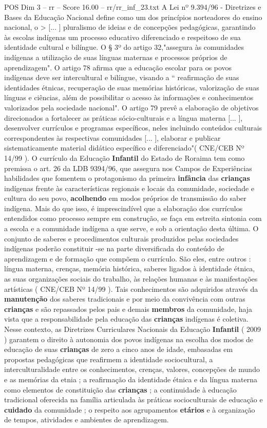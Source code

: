 \begin{textsample}{POS Dim 3 – rr – Score 16.00 – rr/rr\_inf\_23.txt}
A Lei nº 9.394/96 - Diretrizes e Bases da Educação Nacional define como um dos princípios norteadores do ensino nacional, o > [... ] pluralismo de ideias e de concepções pedagógicas, garantindo às escolas indígenas um processo educativo diferenciado e respeitoso de sua identidade cultural e bilíngue.
O § 3º do artigo 32,"assegura às comunidades indígenas a utilização de suas línguas maternas e processos próprios de aprendizagem".
O artigo 78 afirma que a educação escolar para os povos indígenas deve ser intercultural e bilíngue, visando a “ reafirmação de suas identidades étnicas, recuperação de suas memórias históricas, valorização de suas línguas e ciências, além de possibilitar o acesso às informações e conhecimentos valorizados pela sociedade nacional".
O artigo 79 prevê a elaboração de objetivos direcionados a fortalecer as práticas sócio-culturais e a língua materna [... ], desenvolver currículos e programas específicos, neles incluindo conteúdos culturais correspondentes às respectivas comunidades [... ], elaborar e publicar sistematicamente material didático específico e diferenciado"( CNE/CEB Nº 14/99 ).
O currículo da Educação \textbf{Infantil} do Estado de Roraima tem como premissa o art. 26 da LDB 9394/96, que assegura nos Campos de Experiências habilidades que fomentem o protagonismo da primeira \textbf{infância} das \textbf{crianças} indígenas frente às características regionais e locais da comunidade, sociedade e cultura do seu povo, \textbf{acolhendo} em modos próprios de transmissão do saber indígena.
Mais do que isso, é imprescindível que a elaboração dos currículos entendidos como processo sempre em construção, se faça em estreita sintonia com a escola e a comunidade indígena a que serve, e sob a orientação desta última.
O conjunto de saberes e procedimentos culturais produzidos pelas sociedades indígenas poderão constituir -se na parte diversificada do conteúdo de aprendizagem e de formação que compõem o currículo.
São eles, entre outros : língua materna, crenças, memória histórica, saberes ligados à identidade étnica, as suas organizações sociais do trabalho, às relações humanas e às manifestações artísticas ( CNE/CEB Nº 14/99 ).
Tais conhecimentos são adquiridos através da \textbf{manutenção} dos saberes tradicionais e por meio da convivência com outras \textbf{crianças} e são repassados pelos pais e demais \textbf{membros} da comunidade, haja vista que a responsabilidade pela educação das \textbf{crianças} indígenas é coletiva.
Nesse contexto, as Diretrizes Curriculares Nacionais da Educação \textbf{Infantil} ( 2009 ) garantem o direito à autonomia dos povos indígenas na escolha dos modos de educação de suas \textbf{crianças} de zero a cinco anos de idade, embasadas em propostas pedagógicas que reafirmem a identidade sociocultural, a interculturalidade entre os conhecimentos, crenças, valores, concepções de mundo e as memórias da etnia ; a reafirmação da identidade étnica e da língua materna como elementos de constituição das \textbf{crianças} ; a continuidade à educação tradicional oferecida na família articulada às práticas socioculturais de educação e \textbf{cuidado} da comunidade ; o respeito aos agrupamentos \textbf{etários} e à organização de tempos, atividades e ambientes de aprendizagem.

\end{textsample}
